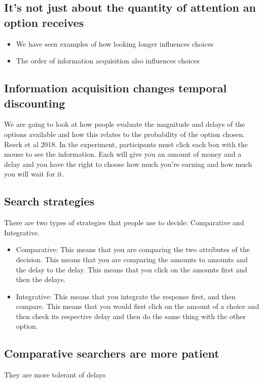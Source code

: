 \subsection{It's not just about the quantity of attention an option receives}
\begin{itemize}
    \item We have seen examples of how looking longer influences choices
    \item The order of information acquisition also influences choices
\end{itemize}
\subsection{Information acquisition changes temporal discounting}
We are going to look at how people evaluate the magnitude and delays of the options available and how this relates to the probability of the option chosen.
\\Reeck et al 2018. In the experiment, participants must click each box with the mouse to see the information. Each will give you an amount of money and a delay and you have the right to choose how much you're earning and how much you will wait for it.

\subsection{Search strategies}
There are two types of strategies that people use to decide: Comparative and Integrative.
\begin{itemize}
    \item Comparative: This means that you are comparing the two attributes of the decision. This means that you are comparing the amounts to amounts and the delay to the delay. This means that you click on the amounts first and then the delays.
    \item Integrative: This means that you integrate the response first, and then compare. This means that you would first click on the amount of a choice and then check its respective delay and then do the same thing with the other option.
\end{itemize}
\subsection{Comparative searchers are more patient}
They are more tolerant of delays
